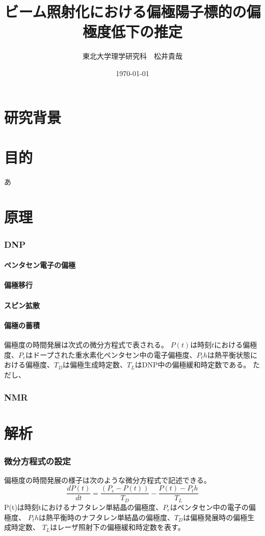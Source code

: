 \documentclass[a5j]{jsarticle}
\title{ビーム照射化における偏極陽子標的の偏極度低下の推定}
\author{東北大学理学研究科　松井貴哉}
\date{\today}
\begin{document}
\maketitle
\part{研究背景}

\part{目的}
あ
\part{原理}
\section{DNP}
\subsection{ペンタセン電子の偏極}
\subsection{偏極移行}
\subsection{スピン拡散}
\subsection{偏極の蓄積}
偏極度の時間発展は次式の微分方程式で表される。
$P(t)$は時刻$t$における偏極度、$P_e$はドープされた重水素化ペンタセン中の電子偏極度、$P_th$は熱平衡状態における偏極度、$T_D$は偏極生成時定数、$T_L$はDNP中の偏極緩和時定数である。
ただし、


\section{NMR}


\part{解析}

\section{微分方程式の設定}
偏極度の時間発展の様子は次のような微分方程式で記述できる。
\begin{equation}
  \frac{dP(t)}{dt}=\frac{(P_e-P(t))}{T_D}-\frac{P(t)-P_th}{T_L}
\end{equation}
P(t)は時刻tにおけるナフタレン単結晶の偏極度、$P_e$はペンタセン中の電子の偏極度、
$P_th$は熱平衡時のナフタレン単結晶の偏極度、$T_D$は偏極発展時の偏極生成時定数、 $T_L$はレーザ照射下の偏極緩和時定数を表す。
\end{document}
